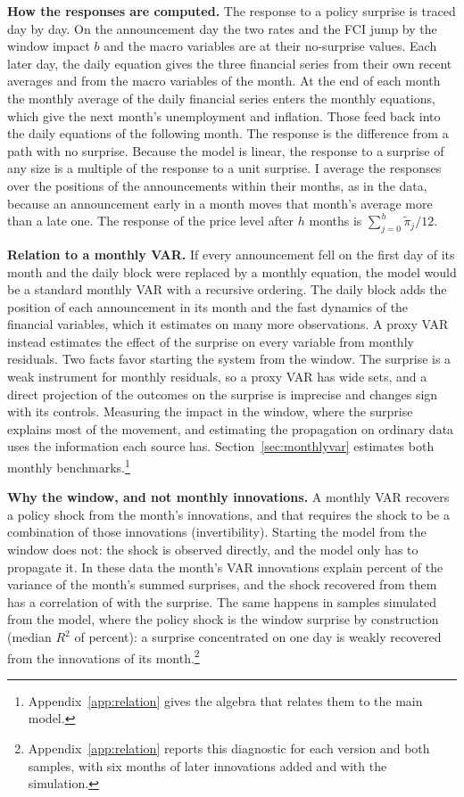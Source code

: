 \documentclass[11pt]{article}
\begin{document}
\textbf{How the responses are computed.} The response to a policy surprise is traced day by day. On the announcement day the two rates and the FCI jump by the window impact $b$ and the macro variables are at their no-surprise values. Each later day, the daily equation gives the three financial series from their own recent averages and from the macro variables of the month. At the end of each month the monthly average of the daily financial series enters the monthly equations, which give the next month's unemployment and inflation. Those feed back into the daily equations of the following month. The response is the difference from a path with no surprise. Because the model is linear, the response to a surprise of any size is a multiple of the response to a unit surprise. I average the responses over the positions of the announcements within their months, as in the data, because an announcement early in a month moves that month's average more than a late one. The response of the price level after $h$ months is $\sum_{j=0}^{h}\tilde\pi_j/12$.

\textbf{Relation to a monthly VAR.} If every announcement fell on the first day of its month and the daily block were replaced by a monthly equation, the model would be a standard monthly VAR with a recursive ordering. The daily block adds the position of each announcement in its month and the fast dynamics of the financial variables, which it estimates on many more observations. A proxy VAR instead estimates the effect of the surprise on every variable from monthly residuals. Two facts favor starting the system from the window. The surprise is a weak instrument for monthly residuals, so a proxy VAR has wide sets, and a direct projection of the outcomes on the surprise is imprecise and changes sign with its controls. Measuring the impact in the window, where the surprise explains most of the movement, and estimating the propagation on ordinary data uses the information each source has. Section~\ref{sec:monthlyvar} estimates both monthly benchmarks.\footnote{Appendix~\ref{app:relation} gives the algebra that relates them to the main model.}

\textbf{Why the window, and not monthly innovations.} A monthly VAR recovers a policy shock from the month's innovations, and that requires the shock to be a combination of those innovations (invertibility). Starting the model from the window does not: the shock is observed directly, and the model only has to propagate it. In these data the month's VAR innovations explain  percent of the variance of the month's summed surprises, and the shock recovered from them has a correlation of  with the surprise. The same happens in samples simulated from the model, where the policy shock is the window surprise by construction (median $R^2$ of  percent): a surprise concentrated on one day is weakly recovered from the innovations of its month.\footnote{Appendix~\ref{app:relation} reports this diagnostic for each version and both samples, with six months of later innovations added and with the simulation.}
\end{document}
